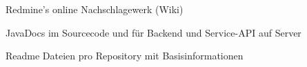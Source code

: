 \begin{frame}
\begin{block}{}
	Redmine's online Nachschlagewerk (Wiki)
\end{block}
\begin{block}{}
	JavaDocs im Sourcecode und für Backend und Service-API auf Server
\end{block}
\begin{block}{}
	Readme Dateien pro Repository mit Basisinformationen
\end{block}
\end{frame}